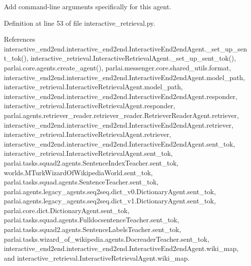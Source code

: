 \begin{DoxyVerb}Add command-line arguments specifically for this agent.\end{DoxyVerb}
 

Definition at line 53 of file interactive\+\_\+retrieval.\+py.



References interactive\+\_\+end2end.\+interactive\+\_\+end2end.\+Interactive\+End2end\+Agent.\+\_\+set\+\_\+up\+\_\+sent\+\_\+tok(), interactive\+\_\+retrieval.\+Interactive\+Retrieval\+Agent.\+\_\+set\+\_\+up\+\_\+sent\+\_\+tok(), parlai.\+core.\+agents.\+create\+\_\+agent(), parlai.\+messenger.\+core.\+shared\+\_\+utils.\+format, interactive\+\_\+end2end.\+interactive\+\_\+end2end.\+Interactive\+End2end\+Agent.\+model\+\_\+path, interactive\+\_\+retrieval.\+Interactive\+Retrieval\+Agent.\+model\+\_\+path, interactive\+\_\+end2end.\+interactive\+\_\+end2end.\+Interactive\+End2end\+Agent.\+responder, interactive\+\_\+retrieval.\+Interactive\+Retrieval\+Agent.\+responder, parlai.\+agents.\+retriever\+\_\+reader.\+retriever\+\_\+reader.\+Retriever\+Reader\+Agent.\+retriever, interactive\+\_\+end2end.\+interactive\+\_\+end2end.\+Interactive\+End2end\+Agent.\+retriever, interactive\+\_\+retrieval.\+Interactive\+Retrieval\+Agent.\+retriever, interactive\+\_\+end2end.\+interactive\+\_\+end2end.\+Interactive\+End2end\+Agent.\+sent\+\_\+tok, interactive\+\_\+retrieval.\+Interactive\+Retrieval\+Agent.\+sent\+\_\+tok, parlai.\+tasks.\+squad2.\+agents.\+Sentence\+Index\+Teacher.\+sent\+\_\+tok, worlds.\+M\+Turk\+Wizard\+Of\+Wikipedia\+World.\+sent\+\_\+tok, parlai.\+tasks.\+squad.\+agents.\+Sentence\+Teacher.\+sent\+\_\+tok, parlai.\+agents.\+legacy\+\_\+agents.\+seq2seq.\+dict\+\_\+v0.\+Dictionary\+Agent.\+sent\+\_\+tok, parlai.\+agents.\+legacy\+\_\+agents.\+seq2seq.\+dict\+\_\+v1.\+Dictionary\+Agent.\+sent\+\_\+tok, parlai.\+core.\+dict.\+Dictionary\+Agent.\+sent\+\_\+tok, parlai.\+tasks.\+squad.\+agents.\+Fulldocsentence\+Teacher.\+sent\+\_\+tok, parlai.\+tasks.\+squad2.\+agents.\+Sentence\+Labels\+Teacher.\+sent\+\_\+tok, parlai.\+tasks.\+wizard\+\_\+of\+\_\+wikipedia.\+agents.\+Docreader\+Teacher.\+sent\+\_\+tok, interactive\+\_\+end2end.\+interactive\+\_\+end2end.\+Interactive\+End2end\+Agent.\+wiki\+\_\+map, and interactive\+\_\+retrieval.\+Interactive\+Retrieval\+Agent.\+wiki\+\_\+map.


